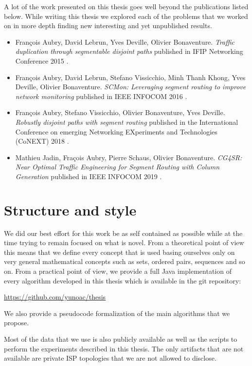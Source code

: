 A lot of the work presented on this thesis goes well beyond the publications listed below. 
While writing this thesis we explored each of the problems that we worked on in more depth
finding new interesting and yet unpublished results.

\begin{itemize}
 \item François Aubry, David Lebrun, Yves Deville, Olivier Bonaventure. \emph{Traffic duplication through segmentable disjoint paths} published in IFIP Networking Conference 2015 \cite{duplication}.
 \item François Aubry, David Lebrun, Stefano Vissicchio, Minh Thanh Khong, Yves Deville, Olivier Bonaventure. \emph{SCMon: Leveraging segment routing to improve network monitoring} published in IEEE INFOCOM 2016 \cite{scmon}.
 \item François Aubry, Stefano Vissicchio,	Olivier Bonaventure, Yves Deville.  \emph{Robustly disjoint paths with segment routing} published in the International Conference on emerging Networking EXperiments and Technologies (CoNEXT) 2018 \cite{rdp}.
 \item  Mathieu Jadin, Fraçois Aubry, Pierre Schaus, Olivier Bonaventure. \emph{CG4SR: Near Optimal Traffic Engineering for Segment Routing with Column Generation} published in IEEE INFOCOM 2019 \cite{CG4SR}.
\end{itemize}


\section{Structure and style}

We did our best effort for this work be as self contained as possible while at the time trying to remain focused on what is novel. 
From a theoretical point of view this
means that we define every concept that is used basing ourselves only on very general 
mathematical concepts such as sets, ordered pairs, sequences and so on. From a practical point of view,
we provide a full Java implementation of every algorithm developed in this thesis which is available in the git
repository:

\begin{center}
\url{https://github.com/yunoac/thesis}
\end{center}

We also provide a pseudocode formalization
of the main algorithms that we propose.

Most of the data that we use is also publicly available as well as the scripts to perform
the experiments described in this thesis. The only artifacts that are not available are private ISP topologies
that we are not allowed to disclose.

